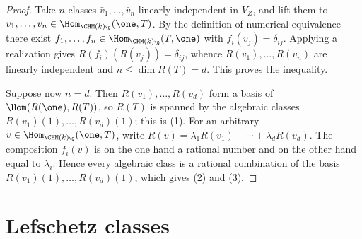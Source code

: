 \begin{proof}
  Take \(n\) classes \(\bar v_1, \dots, \bar v_n\) linearly independent in
  \(V_Z\), and lift them to \(v_1, \dots, v_n \in \Hom_{\CHM(k)_\Q}(\one, T)\).
  By the definition of numerical equivalence there exist
  \(f_1, \dots, f_n \in \Hom_{\CHM(k)_\Q}(T, \one)\) with
  \(f_i(v_j) = \delta_{ij}\). Applying a realization gives
  \(R(f_i)(R(v_j)) = \delta_{ij}\), whence \(R(v_1), \dots, R(v_n)\) are linearly
  independent and \(n \le \dim R(T) = d\). This proves the inequality.

  Suppose now \(n = d\). Then \(R(v_1), \dots, R(v_d)\) form a basis of
  \(\Hom(R(\one), R(T))\), so \(R(T)\) is spanned by the algebraic classes
  \(R(v_1)(1), \dots, R(v_d)(1)\); this is (1). For an arbitrary
  \(v \in \Hom_{\CHM(k)_\Q}(\one, T)\), write
  \(R(v) = \lambda_1 R(v_1) + \cdots + \lambda_d R(v_d)\). The composition
  \(f_i(v)\) is on the one hand a rational number and on the other hand equal to
  \(\lambda_i\). Hence every algebraic class is a rational combination of the
  basis \(R(v_1)(1), \dots, R(v_d)(1)\), which gives (2) and (3).
\end{proof}

\section{Lefschetz classes}

